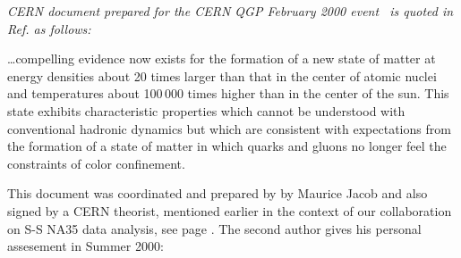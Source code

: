 
\noindent \textit{CERN document prepared for the CERN QGP February 2000 event~\cite{Heinz:2000ba} is quoted in Ref.\cite{Heinz:2008ds} as follows:}\\[-0.7cm]
%
\begin{mdframed}[linecolor=gray,roundcorner=12pt,backgroundcolor=GreenYellow!15,linewidth=1pt,leftmargin=0cm,rightmargin=0cm,topline=true,bottomline=true,skipabove=12pt]\relax%
%
\label{CERN2000} \ldots compelling evidence now exists for the formation of a new state of matter at energy densities about 20 times larger than that in the center of atomic nuclei and temperatures about 100\,000 times higher than in the center of the sun. This state exhibits characteristic properties which cannot be understood with conventional hadronic dynamics but which are consistent with expectations from the formation of a state of matter in which quarks and gluons no longer feel the constraints of color confinement.
\end{mdframed}
\vskip 0.5cm


This document was coordinated and prepared by by Maurice Jacob and also signed by a CERN theorist,  mentioned earlier in the context of our collaboration on S-S NA35 data analysis, see page \pageref{UHentro}. The second author gives his personal assesement in Summer 2000:\\

